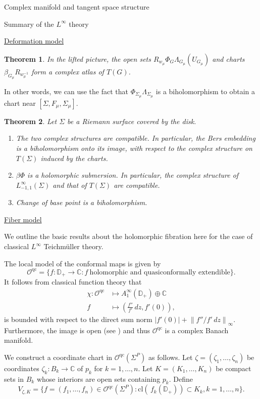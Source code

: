 \documentclass[12pt]{amsart}
\newcommand{\disk}{\ensuremath{\mathbb{D}} } %
\newcommand{\riem}{\Sigma}  %
\theoremstyle{plain}
\newtheorem{theorem}{Theorem}[section]
\theoremstyle{definition}
\theoremstyle{remark}
\numberwithin{equation}{section} %
\numberwithin{figure}{section} %
\begin{document}
\begin{section}{Complex manifold and tangent space structure}
\begin{subsection}{Summary of the $L^\infty$ theory}
\begin{subsubsection}{\underline{Deformation model}}
\begin{theorem}
 In the lifted picture, the open sets $R_{w_\mu} \Phi_G \Lambda_{G_\mu} (U_{G_\mu})$ and charts $\beta_{G_\mu}  R_{w_\mu^{-1}}$ form a complex atlas of $T(G)$.  
\end{theorem}
In other words, we can use the fact that $\Phi_{\riem_\mu} \Lambda_{\riem_\mu}$ is a biholomorphism to obtain a chart near $[\riem,F_\mu,\riem_\mu]$. 
 
\begin{theorem} Let $\riem$ be a Riemann surface covered by the disk. 
 \begin{enumerate}[font=\upshape]
  \item The two complex structures are compatible. In particular, the Bers embedding is a biholomorphism onto its image, with respect to the complex structure on $T(\riem)$ induced by the charts.
  \item $\beta \Phi$ is a holomorphic submersion. In particular, the complex structure of $L^\infty_{-1,1}(\riem)$ and that of $T(\riem)$ are compatible. 
  \item Change of base point is a biholomorphism.
 \end{enumerate} 
\end{theorem}
\end{subsubsection}
\begin{subsubsection}{\underline{Fiber model}}  \label{se:fiber_model_local_coordinates}

We outline the basic results about the holomorphic fibration here for the case of classical $L^\infty$ Teichm\"uller theory.

The local model of the conformal maps is given by 
\[ \mathcal{O}^{\mathrm{qc}} = \{ f: \disk_+ \rightarrow \mathbb{C} : f \ \mathrm{holomorphic\,\, and\,\, quasiconformally \,\,extendible} \}.     \]
It follows from classical function theory that 
\begin{align*}
    \chi: \mathcal{O}^{\mathrm{qc}} & \mapsto A_1^\infty(\disk_+) \oplus \mathbb{C} \\
    f & \mapsto \left(\frac{f''}{f'} \, dz, f'(0) \right),
\end{align*}
is bounded with respect to the direct sum norm $|f'(0)| + \left\| f''/f' \, dz \right\|_\infty$. Furthermore, the image is open (see \cite{RSnonoverlapping}) and thus $\mathcal{O}^{\mathrm{qc}}$ is a complex Banach manifold.  

We construct a coordinate chart in $\mathcal{O}^{\mathrm{qc}}(\riem^P)$ as follows. Let $\zeta = (\zeta_1,\ldots, \zeta_n)$ be coordinates $\zeta_k:B_k \rightarrow \mathbb{C}$ of $p_k$ for $k=1,\ldots,n$. Let $K=(K_1,\ldots,K_n)$ be compact sets in $B_k$ whose interiors are open sets containing $p_k$.  Define 
\begin{equation} \label{eq:V_open_sets_definition}
  V_{\zeta,K} = \{ f=(f_1,\ldots,f_n) \in \mathcal{O}^{\mathrm{qc}}(\riem^P) : \mathrm{cl} (\, f_k(\disk_+)) \subset K_k, k=1,\ldots,n \}.    
\end{equation}


\end{subsubsection}
\end{subsection}
\end{section}
\end{document}
